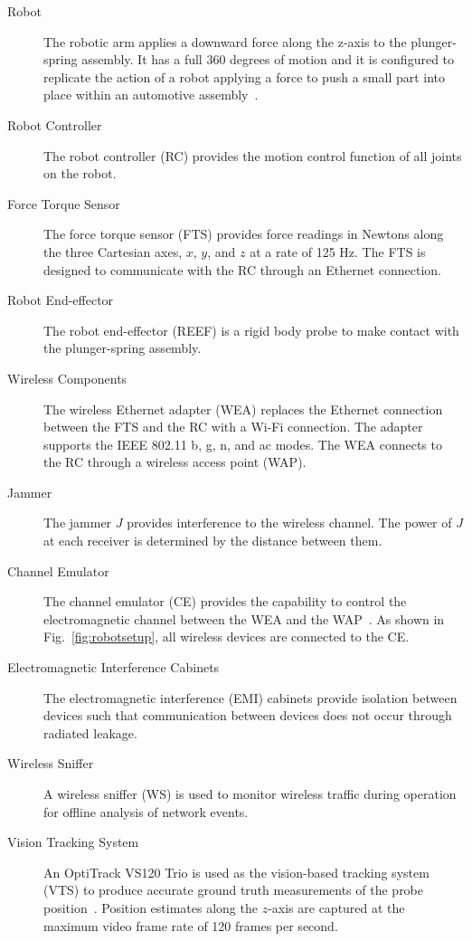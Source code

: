 \begin{description}
    \item[Robot] The robotic arm applies a downward force along the z-axis to the plunger-spring assembly. It has a full 360 degrees of motion and it is configured to replicate the action of a robot applying a force to push a small part into place within an automotive assembly~\cite{Cossio2012.RoboticsHandbook}. 
    
    \item[Robot Controller] The robot controller (RC) provides the motion control function of all joints on the robot. 
    
    \item[Force Torque Sensor] The force torque sensor (FTS) provides force  readings in Newtons along the three Cartesian axes, $x$, $y$, and $z$ at a rate of 125 Hz. The FTS is designed to communicate with the RC through an Ethernet connection. 
    
    \item[Robot End-effector] The robot end-effector (REEF) is a rigid body probe  to make contact with the plunger-spring assembly.
    
    \item[Wireless Components]  The wireless Ethernet adapter (WEA) replaces the Ethernet connection between the FTS and the RC with a Wi-Fi connection. The adapter supports the IEEE 802.11 b, g, n, and ac modes. The WEA connects to the RC through a wireless access point (WAP).
    
    \item[Jammer] The jammer $J$ provides interference to the wireless channel. The power of $J$ at each receiver is determined by the distance between them.
    
    \item[Channel Emulator] The channel emulator (CE) provides the capability to control the electromagnetic channel between the WEA and the WAP~\cite{RFnest}. As shown in Fig.~\ref{fig:robotsetup}, all wireless devices are connected to the CE.
    
    \item[Electromagnetic Interference Cabinets] The electromagnetic interference (EMI) cabinets provide isolation between devices such that communication between devices does not occur through radiated leakage.
    
    \item[Wireless Sniffer]  A wireless sniffer (WS) is used to monitor wireless traffic during operation for offline analysis of network events.
    
    \item[Vision Tracking System]  An OptiTrack VS120 Trio is used as the vision-based tracking system (VTS) to produce accurate ground truth measurements of the probe position~\cite{Optitrack}. Position estimates along the $z$-axis are captured at the maximum video frame rate of 120 frames per second. 
    
\end{description}

